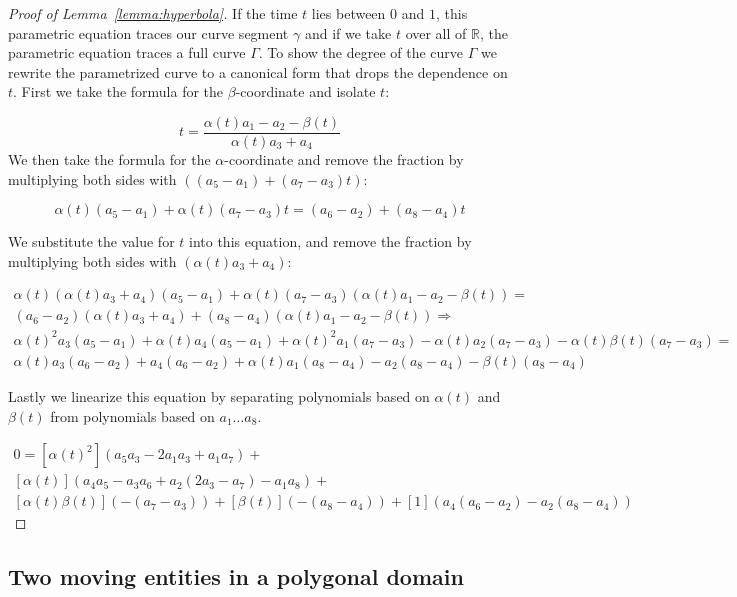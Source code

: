\documentclass[UKenglish]{lipics-v2019}
\begin{document}
\begin{proof}[Proof of Lemma~\ref{lemma:hyperbola}]
  If the time $t$ lies between $0$ and $1$, this parametric equation traces our curve segment $\gamma$ and if we take $t$ over all of $\mathbb{R}$, the parametric equation traces a full curve $\Gamma$. To show the degree of the curve $\Gamma$ we rewrite the parametrized curve to a canonical form that drops the dependence on $t$. First we take the formula for the $\beta$-coordinate and isolate $t$:
  
  \[
     t = \frac{\alpha(t) a_1 - a_2  - \beta(t)}{\alpha(t) a_3 + a_4}
  \]
We then take the formula for the $\alpha$-coordinate and remove the fraction by multiplying both sides with $ ((a_5 - a_1)  + (a_7 - a_3) t)$:

\[ 
\alpha(t)(a_5 - a_1)  + \alpha(t)(a_7 - a_3) t = (a_6 - a_2) + (a_8 - a_4) t
\]

We substitute the value for $t$ into this equation, and remove the fraction by multiplying both sides with $(\alpha(t) a_3 + a_4)$:

\begin{align*}
\alpha(t)(\alpha(t) a_3 + a_4)(a_5 - a_1)  + \alpha(t)(a_7 - a_3) (\alpha(t) a_1 - a_2  - \beta(t)) = \\
(a_6 - a_2)(\alpha(t) a_3 + a_4) + (a_8 - a_4) (\alpha(t) a_1 - a_2  - \beta(t)) \Rightarrow \\
\alpha(t)^2a_3(a_5 - a_1) + \alpha(t)a_4(a_5 - a_1)  + \alpha(t)^2a_1(a_7 - a_3)
- \alpha(t)a_2(a_7 - a_3)  - \alpha(t)\beta(t)(a_7 - a_3) = \\
\alpha(t) a_3(a_6 - a_2) + a_4(a_6 - a_2) + \alpha(t)a_1(a_8 - a_4) - a_2 (a_8 - a_4) - \beta(t)(a_8 - a_4) 
\end{align*}

Lastly we linearize this equation by separating polynomials based on $\alpha(t)$ and $\beta(t)$ from polynomials based on $a_1 \ldots a_8$.

\begin{align}
\label{eq:hyperbola}
    0= [\alpha(t)^2](a_5 a_3 -2 a_1 a_3 + a_1 a_7)+ \\
    [\alpha(t)](a_4 a_5 - a_3 a_6 + a_2 (2 a_3 - a_7) - a_1 a_8) + \\
    [\alpha(t)\beta(t)](-(a_7 - a_3)) + [\beta(t)](-(a_8 - a_4)) + [1](a_4(a_6 - a_2)- a_2 (a_8 - a_4))
\end{align}
\end{proof}


\subsection{Two moving entities in a polygonal domain}
\label{app:Two_moving_entities_in_a_polygonal_domain}
\end{document}
